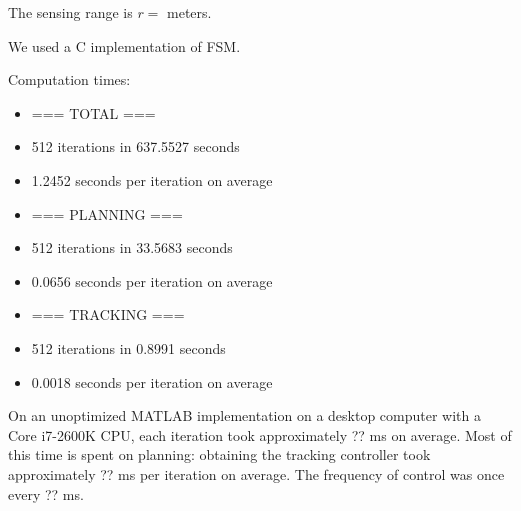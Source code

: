 The sensing range is $r = $ meters.

We used a C implementation of FSM.

Computation times:
\begin{itemize}
\item === TOTAL ===
\item  512 iterations in 637.5527 seconds
\item 1.2452 seconds per iteration on average
\item === PLANNING ===
\item 512 iterations in 33.5683 seconds
\item 0.0656 seconds per iteration on average
\item === TRACKING ===
\item 512 iterations in 0.8991 seconds
\item 0.0018 seconds per iteration on average
\end{itemize}

On an unoptimized MATLAB implementation on a desktop computer with a Core i7-2600K CPU, each iteration took approximately ?? ms on average. Most of this time is spent on planning: obtaining the tracking controller took approximately ?? ms per iteration on average. The frequency of control was once every ?? ms.


